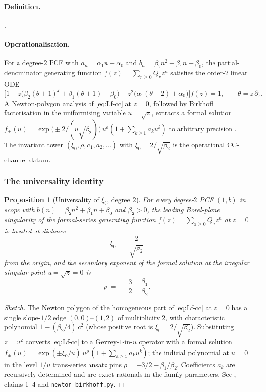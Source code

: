 \documentclass[11pt,reqno]{amsart}
\theoremstyle{plain}
\newtheorem{proposition}[theorem]{Proposition}
\theoremstyle{definition}
\theoremstyle{remark}
\newcommand{\CC}{\mathrm{CC}}
\begin{document}
\paragraph{Definition.} .

\paragraph{Operationalisation.}
For a degree-$2$ PCF with $a_n = \alpha_1 n + \alpha_0$ and
$b_n = \beta_2 n^2 + \beta_1 n + \beta_0$, the partial-denominator
generating function $f(z) = \sum_{n \ge 0} Q_n z^n$ satisfies
the order-$2$ linear ODE
\begin{equation}
\bigl[1
  - z\bigl(\beta_2(\theta+1)^2+\beta_1(\theta+1)+\beta_0\bigr)
  - z^2\bigl(\alpha_1(\theta+2)+\alpha_0\bigr)\bigr] f(z) = 1,
\qquad \theta = z\,\partial_z. \label{eq:Lf-cc}
\end{equation}
A Newton-polygon analysis of \eqref{eq:Lf-cc} at $z=0$,
followed by Birkhoff factorisation in the uniformising
variable $u = \sqrt z$, extracts a formal solution
$f_\pm(u) = \exp\bigl(\pm 2/(u\sqrt{\beta_2})\bigr)\,
u^{\rho}(1 + \sum_{k \ge 1} a_k u^k)$ to arbitrary precision
\cite{siarc_cc_pipeline_g}. The invariant tower
$(\xi_0, \rho, a_1, a_2, \ldots)$ with
$\xi_0 = 2/\sqrt{\beta_2}$ is the operational $\CC$-channel
datum.

\subsubsection*{The universality identity}

\begin{proposition}[Universality of $\xi_0$, degree $2$]
\label{prop:xi0}
For every degree-$2$ PCF $(1, b)$ in scope with
$b(n) = \beta_2 n^2 + \beta_1 n + \beta_0$ and $\beta_2 > 0$,
the leading Borel-plane singularity of the formal-series
generating function $f(z) = \sum_{n \ge 0} Q_n z^n$ at
$z=0$ is located at distance
\[
  \xi_0 \;=\; \frac{2}{\sqrt{\beta_2}}
\]
from the origin, and the secondary exponent of the formal
solution at the irregular singular point $u = \sqrt z = 0$ is
\[
  \rho \;=\; -\frac{3}{2} - \frac{\beta_1}{\beta_2}.
\]
\end{proposition}

\begin{proof}[Sketch]
The Newton polygon of the homogeneous part of
\eqref{eq:Lf-cc} at $z=0$ has a single slope-$1/2$ edge
$(0,0)$--$(1,2)$ of multiplicity $2$, with characteristic
polynomial $1 - (\beta_2/4)\,c^2$ (whose positive root is
$\xi_0 = 2/\sqrt{\beta_2}$). Substituting $z = u^2$ converts
\eqref{eq:Lf-cc} to a Gevrey-$1$-in-$u$ operator with a
formal solution
$f_\pm(u) = \exp(\pm \xi_0 / u) \, u^{\rho}\,(1+\sum_{k \ge 1}
a_k u^k)$; the indicial polynomial at $u=0$ in the level
$1/u$ trans-series ansatz pins
$\rho = -3/2 - \beta_1/\beta_2$. Coefficients $a_k$ are
recursively determined and are exact rationals in the family
parameters. See \cite{siarc_cc_pipeline_g}, claims 1--4 and
\texttt{newton\_birkhoff.py}.
\end{proof}
\end{document}
